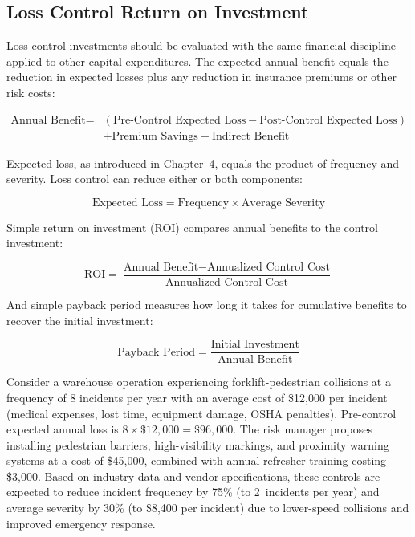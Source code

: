 \documentclass[11pt,openany]{book}
\begin{document}
\subsection{Loss Control Return on Investment}
\label{subsec:loss-control-roi}

Loss control investments should be evaluated with the same financial
discipline applied to other capital expenditures. The expected annual benefit
equals the reduction in expected losses plus any reduction in insurance
premiums or other risk costs:

\[
\begin{split}
\text{Annual Benefit} = {}& (\text{Pre-Control Expected Loss} -
  \text{Post-Control Expected Loss}) \\
  & + \text{Premium Savings} + \text{Indirect Benefit}
\end{split}
\]

Expected loss, as introduced in Chapter~4, equals the product of frequency and
severity. Loss control can reduce either or both components:

\[
\text{Expected Loss} = \text{Frequency} \times \text{Average Severity}
\]

Simple return on investment (ROI) compares annual benefits to the control
investment:

\[
\text{ROI} = \frac{\text{Annual Benefit} - \text{Annualized Control Cost}}
  {\text{Annualized Control Cost}}
\]

And simple payback period measures how long it takes for cumulative benefits
to recover the initial investment:

\[
\text{Payback Period} = \frac{\text{Initial Investment}}{\text{Annual Benefit}}
\]

Consider a warehouse operation experiencing forklift-pedestrian collisions at
a frequency of 8 incidents per year with an average cost of \$12{,}000 per
incident (medical expenses, lost time, equipment damage, OSHA penalties).
Pre-control expected annual loss is \(8 \times \$12{,}000 = \$96{,}000\). The
risk manager proposes installing pedestrian barriers, high-visibility
markings, and proximity warning systems at a cost of \$45{,}000, combined with
annual refresher training costing \$3{,}000. Based on industry data and vendor
specifications, these controls are expected to reduce incident frequency by
75\% (to 2~incidents per year) and average severity by 30\% (to \$8{,}400 per
incident) due to lower-speed collisions and improved emergency response.
\end{document}

